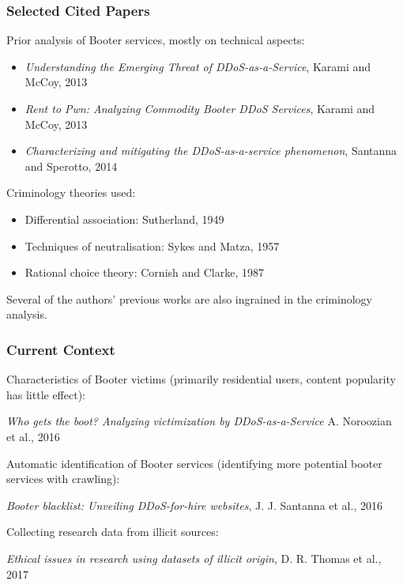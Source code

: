 \documentclass[aspectratio=1610]{beamer}
\begin{document}

\begin{frame}
\frametitle{Selected Cited Papers}
Prior analysis of Booter services, mostly on technical aspects: \par
\begin{itemize}
\item \emph{Understanding the Emerging Threat of DDoS-as-a-Service}, Karami and McCoy, 2013 \cite{karami2013understanding}
\item \emph{Rent to Pwn: Analyzing Commodity Booter DDoS Services}, Karami and McCoy, 2013 \cite{karami2013rent}
\item \emph{Characterizing and mitigating the DDoS-as-a-service phenomenon}, Santanna and Sperotto, 2014 \cite{santanna2014characterizing}
\end{itemize}
\vspace{0.5em}
Criminology theories used: \par
\begin{itemize}
\item Differential association: Sutherland, 1949  \cite{sutherland1983white}
\item Techniques of neutralisation: Sykes and Matza, 1957 \cite{sykes1957techniques}
\item Rational choice theory: Cornish and Clarke, 1987 \cite{cornish1987understanding}
\end{itemize}
Several of the authors' previous works are also ingrained in the criminology analysis.
\end{frame}


\begin{frame}
\frametitle{Current Context}
Characteristics of Booter victims (primarily residential users, content popularity has little effect): \par
\emph{Who gets the boot? Analyzing victimization by DDoS-as-a-Service} A. Noroozian et al., 2016 \cite{noroozian2016gets} \par
\vspace{1em}
Automatic identification of Booter services (identifying more potential booter services with crawling): \par
\emph{Booter blacklist: Unveiling DDoS-for-hire websites}, J. J. Santanna et al., 2016 \cite{santanna2016booter} \par
\vspace{1em}
Collecting research data from illicit sources:\par
\emph{Ethical issues in research using datasets of illicit origin}, D. R. Thomas et al., 2017 \cite{thomas2017ethical} 
\end{frame}
\end{document}
